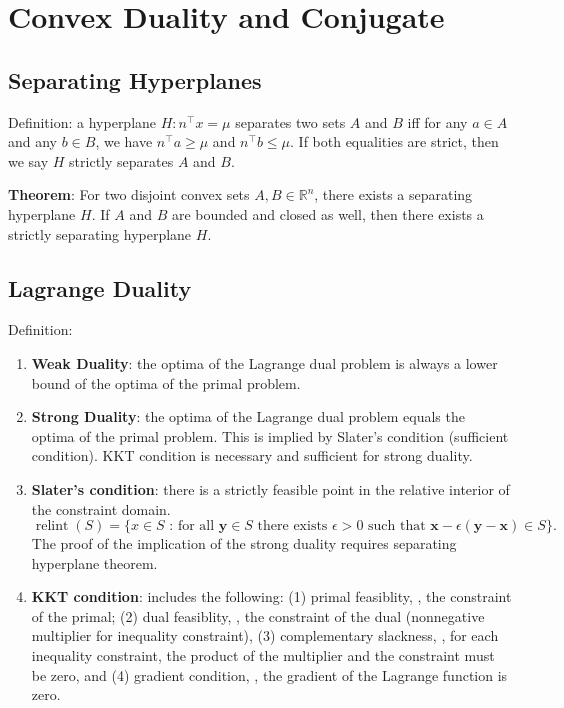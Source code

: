 \section{Convex Duality and Conjugate}

\subsection{Separating Hyperplanes}

Definition: a hyperplane $H: n^\top x = \mu$ separates two sets $A$ and $B$ iff for any $a \in A$ and any $b \in B$, we have $n^\top a \ge \mu$ and $n^\top b \le \mu$. If both equalities are strict, then we say $H$ strictly separates $A$ and $B$.

\textbf{Theorem}: For two disjoint convex sets $A, B \in \mathbb{R}^{n}$, there exists a separating hyperplane $H$. If $A$ and $B$ are bounded and closed as well, then there exists a strictly separating hyperplane $H$.

\subsection{Lagrange Duality}

Definition:
\begin{enumerate}
    \item \textbf{Weak Duality}: the optima of the Lagrange dual problem is always a lower bound of the optima of the primal problem.
    \item \textbf{Strong Duality}: the optima of the Lagrange dual problem equals the optima of the primal problem. This is implied by Slater's condition (sufficient condition). KKT condition is necessary and sufficient for strong duality.
    \item \textbf{Slater's condition}: there is a strictly feasible point in the relative interior of the constraint domain. $\operatorname{relint}(S)=\{x \in S \text { : for all } \boldsymbol{y} \in S \text { there exists } \epsilon>0 \text { such that } \boldsymbol{x}-\epsilon(\boldsymbol{y}-\boldsymbol{x}) \in S\}.$ The proof of the implication of the strong duality requires separating hyperplane theorem.
    \item \textbf{KKT condition}: includes the following: (1) primal feasiblity, \ie, the constraint of the primal; (2) dual feasiblity, \ie, the constraint of the dual (nonnegative multiplier for inequality constraint), (3) complementary slackness, \ie, for each inequality constraint, the product of the multiplier and the constraint must be zero, and (4) gradient condition, \ie, the gradient of the Lagrange function is zero.
\end{enumerate}

